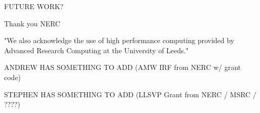 \documentclass[%
preprint,                                  %
nofootinbib,
 amsmath,amssymb,
 aps,
]{revtex4-1}
\begin{document}
FUTURE WORK?

\begin{acknowledgements}
Thank you NERC

"We also acknowledge the use of high performance computing provided by Advanced Research Computing at the University of Leeds."

ANDREW HAS SOMETHING TO ADD (AMW IRF from NERC w/ grant code)

STEPHEN HAS SOMETHING TO ADD (LLSVP Grant from NERC / MSRC / ????)
\end{acknowledgements}


\end{document}
